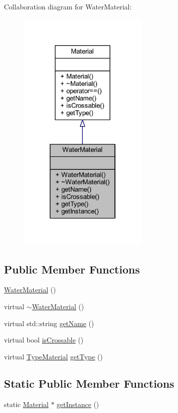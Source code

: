 Collaboration diagram for Water\+Material\+:\nopagebreak
\begin{figure}[H]
\begin{center}
\leavevmode
\includegraphics[width=178pt]{class_water_material__coll__graph}
\end{center}
\end{figure}
\subsection*{Public Member Functions}
\begin{DoxyCompactItemize}
\item 
\hyperlink{class_water_material_abd76861771f91b8b064d61cdaaef2a56}{Water\+Material} ()
\item 
virtual \hyperlink{class_water_material_adf85c6c86a0e388fa90ccf64d4d89dbd}{$\sim$\+Water\+Material} ()
\item 
virtual std\+::string \hyperlink{class_water_material_af831d9f710ae970f00e6dcd9efea8495}{get\+Name} ()
\item 
virtual bool \hyperlink{class_water_material_ae73e422826cfb9992a276b4177f4bfe3}{is\+Crossable} ()
\item 
virtual \hyperlink{_material_8hpp_af43d43a4fff6221e289f8d3db9904ec0}{Type\+Material} \hyperlink{class_water_material_acd1d36b1a928f8e1aec184f6eb542c31}{get\+Type} ()
\end{DoxyCompactItemize}
\subsection*{Static Public Member Functions}
\begin{DoxyCompactItemize}
\item 
static \hyperlink{class_material}{Material} $\ast$ \hyperlink{class_water_material_a93ef4bfe5f82fc3f5eff5d652d44e73b}{get\+Instance} ()
\end{DoxyCompactItemize}


